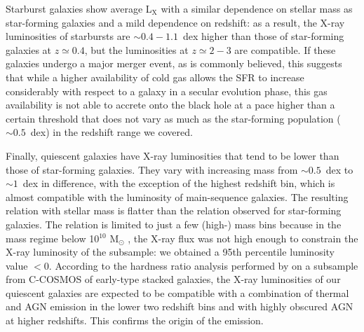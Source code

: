    
Starburst galaxies show average L$_\text{X}$ with a similar dependence on stellar mass as star-forming galaxies and a mild dependence on redshift: as a result, the X-ray luminosities of starbursts are $\sim0.4-1.1$~dex higher than those of star-forming galaxies at $z\simeq0.4$, but the luminosities at $z\simeq2-3$ are compatible.
If these galaxies undergo a major merger event, as is commonly believed, this suggests that while a higher availability of cold gas allows the SFR to increase considerably with respect to a galaxy in a secular evolution phase, this gas availability is not able to accrete onto the black hole at a pace higher than a certain threshold that does not vary as much as the star-forming population ($\sim0.5$~dex) in the redshift range we covered. 


Finally, quiescent galaxies have X-ray luminosities that tend to be lower than those of star-forming galaxies. They vary with increasing mass from $\sim0.5$~dex to $\sim1$~dex in difference,
with the exception of the highest redshift bin, which is almost compatible with the luminosity of main-sequence galaxies. The resulting relation with stellar mass is flatter than the relation observed for star-forming galaxies. The relation is limited to just a few (high-) mass bins because in the mass regime below 10$^{10}$ M$_{\odot}$ , the X-ray flux was not high enough to constrain the X-ray luminosity of the subsample: we obtained a 95th percentile luminosity value $<0$. 
According to the hardness ratio analysis performed by \citet{2016ApJ...823..112P} on a subsample from C-COSMOS of early-type stacked galaxies, the X-ray luminosities of our quiescent galaxies are expected to be compatible with a combination of thermal and AGN emission in the lower two redshift bins and with highly obscured AGN at higher redshifts. This confirms the origin of the emission.


